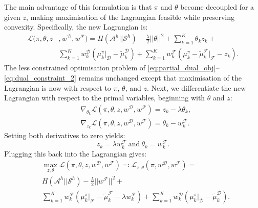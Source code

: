 \documentclass[letterpaper]{article}
\newcommand{\sw}[1]{\textcolor{red}{SW: #1}}
\newcommand{\jm}[1]{\textcolor{blue}{Joao: #1}}
\newcommand{\ks}[1]{\textcolor{green}{Kyriacos: #1}}
\newcommand{\sw}[1]{}
\newcommand{\jm}[1]{}
\newcommand{\ks}[1]{}
\begin{document}
The main advantage of this formulation is that $\pi$ and $\theta$ become decoupled for a given $z$, making maximisation of the Lagrangian feasible while preserving convexity. 
Specifically, the new Lagrangian is:
\begin{equation}
\begin{split}
\label{eq:partial_lagrangian_failure}
\mathcal{L}(\pi,\theta,z &,w^{\mathcal{D}},w^{\mathcal{F}})=  H(\mathcal{A}^h||\mathcal{S}^h) - \frac{\lambda}{2}||\theta||^2 + \sum_{k=1}^K\theta_kz_k+\\
&
\sum_{k=1}^Kw^{\mathcal{D}}_k(\mu^{\pi}_k|_{\mathcal{D}}-\widetilde{\mu}^{\mathcal{D}}_k) + 
\sum_{k=1}^Kw^{\mathcal{F}}_k (\mu^{\pi}_k -\widetilde{\mu}^{\mathcal{F}}_k|_{\mathcal{F}} - z_k).
\end{split}
\end{equation}
The less constrained optimisation problem of \eqref{eq:partial_dual_obj}--\eqref{eq:dual_constraint_2} remains unchanged except that maximisation of the Lagrangian is now with respect to $\pi$, $\theta$, and $z$.
Next, we differentiate the new Lagrangian with respect to the primal variables, beginning with $\theta$ and $z$:
\begin{align}
	&\nabla_{\theta_k}\mathcal{L}(\pi,\theta,z,w^{\mathcal{D}},w^{\mathcal{F}}) = z_k - \lambda\theta_k,\\
	&\nabla_{z_k}\mathcal{L}(\pi,\theta,z,w^{\mathcal{D}},w^{\mathcal{F}}) = \theta_k - w^{\mathcal{F}}_k.
\end{align}
Setting both derivatives to zero yields:
\begin{equation}
	z_k = \lambda w^{\mathcal{F}}_k~\mathrm{and}~\theta_k = w^{\mathcal{F}}_k.
\end{equation}
Plugging this back into the Lagrangian gives:
\begin{equation}
\begin{split}
\label{eq:partial_lagrangian_failure_simple}
&\max_{z,\theta}\mathcal{L}(\pi,\theta,z,w^{\mathcal{D}},w^{\mathcal{F}})\eqqcolon \mathcal{L}_{z,\theta}(\pi,w^{\mathcal{D}},w^{\mathcal{F}}) =\\& H(\mathcal{A}^h||\mathcal{S}^h) - \frac{\lambda}{2}||w^{\mathcal{F}}||^2 +\\ 
&\sum_{k=1}^Kw^{\mathcal{F}}_k (\mu^{\pi}_k|_{\mathcal{F}} -\widetilde{\mu}^{\mathcal{F}}_k-\lambda w^{\mathcal{F}}_k) + \sum_{k=1}^Kw^{\mathcal{D}}_k(\mu^{\pi}_k|_{\mathcal{D}}-\widetilde{\mu}^{\mathcal{D}}_k).
\end{split}
\end{equation}
\end{document}
